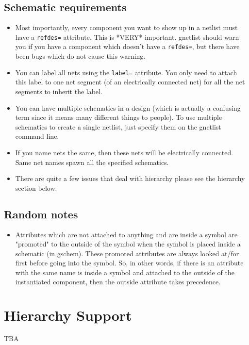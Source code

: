 \documentclass{article}
\begin{document}
\subsection{Schematic requirements}
\begin{itemize}
\item Most importantly, every component you want to show up in a
  netlist must have a {\tt refdes=} attribute.  This is *VERY* important.
  gnetlist should warn you if you have a component which doesn't have
  a {\tt refdes=}, but there have been bugs which do not cause this warning.
  
\item You can label all nets using the {\tt label=} attribute.  You only
  need to attach this label to one net segment (of an electrically
  connected net) for all the net segments to inherit the label.
  
\item You can have multiple schematics in a design (which is actually
  a confusing term since it means many different things to people).
  To use multiple schematics to create a single netlist, just specify
  them on the gnetlist command line.
  
\item If you name nets the same, then these nets will be electrically
  connected.  Same net names spawn all the specified schematics.
  
\item There are quite a few issues that deal with hierarchy please see
  the hierarchy section below.
\end{itemize}
           
\subsection{Random notes}
\begin{itemize}
\item Attributes which are not attached to anything and are inside a
  symbol are "promoted" to the outside of the symbol when the symbol
  is placed inside a schematic (in gschem).  These promoted attributes
  are always looked at/for first before going into the symbol.  So, in
  other words, if there is an attribute with the same name is inside a
  symbol and attached to the outside of the instantiated component,
  then the outside attribute takes precedence.
\end{itemize}


\section{Hierarchy Support}
TBA
\end{document}
